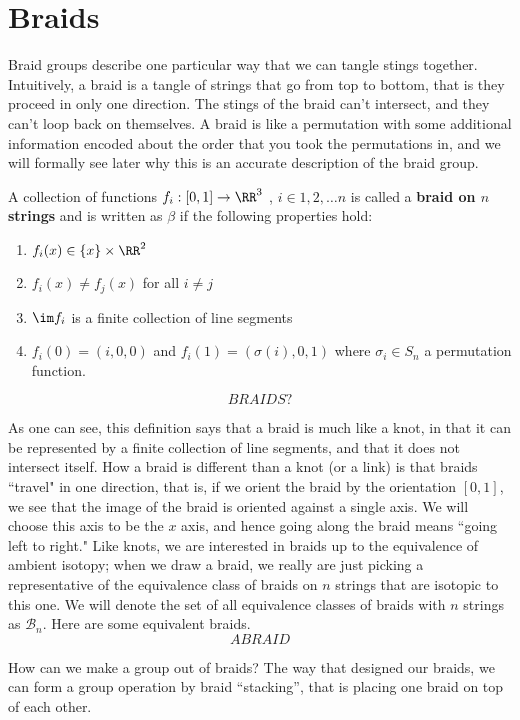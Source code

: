 \section{Braids}
\label{sec:knot:braids}
Braid groups describe one particular way that we can tangle stings together. Intuitively, a braid is a tangle of strings that go from top to bottom, that is they proceed in only one direction. The stings of the braid can't intersect, and they can't loop back on themselves. A braid is like a permutation with some additional information encoded about the order that you took the permutations in, and we will formally see later why this is an accurate description of the braid group.
\begin{definition} A collection of functions $f_i:[0,1]\to \RR^3$ , $i\in {1,2,\ldots n}$ is called a \textbf{braid on $n$ strings} and is written as $\beta$ if the following properties hold:
\begin{enumerate}
\item $f_i(x) \in \{x\}\times \RR^2$
\item $f_i(x)\neq f_j(x)$ for all $i\neq j$
\item $\im f_i$ is a finite collection of line segments
\item $f_i(0)=(i,0,0) $ and $f_i(1)=(\sigma(i),0,1)$ where $\sigma_i\in S_n$ a permutation function.
\end{enumerate}
\end{definition}

\[
BRAIDS?
\]


As one can see, this definition says that a braid is much like a knot, in that it can be represented by a finite collection of line segments, and that it does not intersect itself. How a braid is different than a knot (or a link) is that braids ``travel" in one direction, that is, if we orient the braid by the orientation $[0,1]$, we see that the image of the braid is oriented against a single axis. We will choose this axis to be the $x$ axis, and hence going along the braid means ``going left to right." Like knots, we are interested in braids up to the equivalence of ambient isotopy; when we draw a braid, we really are just picking a representative of the equivalence class of braids on $n$
strings that are isotopic to this one. We will denote the set of all equivalence classes of braids with $n$ strings as $\mathcal{B}_n$. Here are some equivalent braids.
\[
A BRAID
\]


How can we make a group out of braids? The way that designed our braids, we can form a group operation by braid ``stacking'', that is placing one braid on top of each other. 

